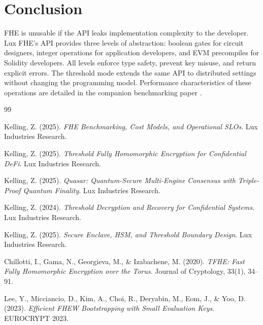\section{Conclusion}


FHE is unusable if the API leaks implementation complexity to the developer. Lux FHE's API provides three levels of abstraction: boolean gates for circuit designers, integer operations for application developers, and EVM precompiles for Solidity developers. All levels enforce type safety, prevent key misuse, and return explicit errors. The threshold mode extends the same API to distributed settings without changing the programming model. Performance characteristics of these operations are detailed in the companion benchmarking paper \cite{fhe-benchmarks}.

\begin{thebibliography}{99}

Kelling, Z. (2025).
\textit{FHE Benchmarking, Cost Models, and Operational SLOs}.
Lux Industries Research.

Kelling, Z. (2025).
\textit{Threshold Fully Homomorphic Encryption for Confidential DeFi}.
Lux Industries Research.

Kelling, Z. (2025).
\textit{Quasar: Quantum-Secure Multi-Engine Consensus with Triple-Proof Quantum Finality}.
Lux Industries Research.

Kelling, Z. (2024).
\textit{Threshold Decryption and Recovery for Confidential Systems}.
Lux Industries Research.

Kelling, Z. (2025).
\textit{Secure Enclave, HSM, and Threshold Boundary Design}.
Lux Industries Research.

Chillotti, I., Gama, N., Georgieva, M., \& Izabachene, M. (2020).
\textit{TFHE: Fast Fully Homomorphic Encryption over the Torus}.
Journal of Cryptology, 33(1), 34--91.

Lee, Y., Micciancio, D., Kim, A., Choi, R., Deryabin, M., Eom, J., \& Yoo, D. (2023).
\textit{Efficient FHEW Bootstrapping with Small Evaluation Keys}.
EUROCRYPT 2023.

\end{thebibliography}

